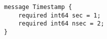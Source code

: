\begin{verbatim}
message Timestamp {
    required int64 sec = 1;
    required int64 nsec = 2;
}
\end{verbatim}
